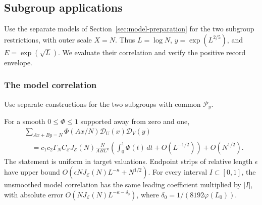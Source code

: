 \subsection{Subgroup applications}\label{sec:model}

Use the separate models of Section~\ref{sec:model-preparation} for
the two subgroup restrictions, with outer scale \(X=N\).
Thus \(L=\log N\), \(y=\exp(L^{2/5})\), and
\(E=\exp(\sqrt L)\). We evaluate their correlation and verify the
positive record envelope.

\subsubsection{The model correlation}

Use separate constructions for the two subgroups with common \(\mathcal P_y\).
\begin{proposition}\label{prop:model-correlation}
For a smooth \(0\le\Phi\le1\) supported away from zero and one,
\begin{align*}
 &\sum_{Ax+By=N}\Phi(Ax/N)\mathcal D_U(x)\mathcal D_V(y)\\
 &\quad=c_1c_2\Gamma_N C_{\mathcal E}J_{\mathcal E}(N)
       \frac{N}{AB L^\kappa}
       \left(\int_0^1\Phi(t)\,dt+O(L^{-1/2})\right)+O(N^{1/2}).
\end{align*}
The statement is uniform in target valuations. Endpoint strips of
relative length \(\epsilon\) have upper bound
\(O(\epsilon NJ_{\mathcal E}(N)L^{-\kappa}+N^{1/2})\).
For every interval \(I\subset[0,1]\), the unsmoothed model correlation
has the same leading coefficient multiplied by \(|I|\), with absolute
error \(O(NJ_{\mathcal E}(N)L^{-\kappa-\delta_0})\), where
\(\delta_0=1/(8192\varphi(L_0))\).
\end{proposition}
